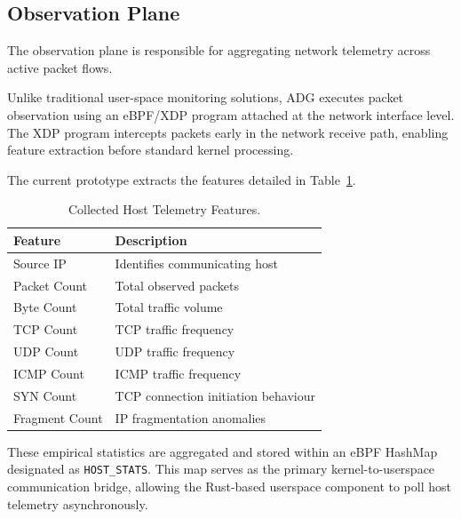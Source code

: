 \documentclass[conference]{IEEEtran}
\begin{document}

\subsection{Observation Plane}

The observation plane is responsible for aggregating network telemetry across active packet flows. 

Unlike traditional user-space monitoring solutions, ADG executes packet observation using an eBPF/XDP program attached at the network interface level. The XDP program intercepts packets early in the network receive path, enabling feature extraction before standard kernel processing.

The current prototype extracts the features detailed in Table~\ref{tab:features}.

\begin{table}[h]
\centering
\caption{Collected Host Telemetry Features.}
\label{tab:features}
\begin{tabular}{ll}
\toprule
Feature & Description \\
\midrule
Source IP & Identifies communicating host \\
Packet Count & Total observed packets \\
Byte Count & Total traffic volume \\
TCP Count & TCP traffic frequency \\
UDP Count & UDP traffic frequency \\
ICMP Count & ICMP traffic frequency \\
SYN Count & TCP connection initiation behaviour \\
Fragment Count & IP fragmentation anomalies \\
\bottomrule
\end{tabular}
\end{table}

These empirical statistics are aggregated and stored within an eBPF HashMap designated as \texttt{HOST\_STATS}. This map serves as the primary kernel-to-userspace communication bridge, allowing the Rust-based userspace component to poll host telemetry asynchronously.

\end{document}
